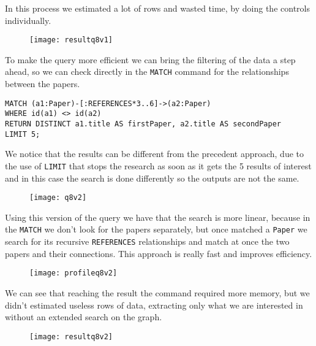 \begin{enumerate}
    In this process we estimated a lot of rows and wasted time, by doing the controls individually.
    \begin{figure}[H]
        \begin{center}
            \texttt{[image: resultq8v1]}
            \label{fig:resultq8v1}%
        \end{center}
    \end{figure}
    To make the query more efficient we can bring the filtering of the data a step ahead, so we can check directly in the \verb|MATCH| command for the relationships between the papers.
    \begin{lstlisting}[label={lst:lstlisting36}]
MATCH (a1:Paper)-[:REFERENCES*3..6]->(a2:Paper)
WHERE id(a1) <> id(a2)
RETURN DISTINCT a1.title AS firstPaper, a2.title AS secondPaper
LIMIT 5;
    \end{lstlisting}
    We notice that the results can be different from the precedent approach, due to the use of \verb|LIMIT| that stops the research as soon as it gets the 5 results of interest and in this case the search is done differently so the outputs are not the same.
    \begin{figure}[H]
        \begin{center}
            \texttt{[image: q8v2]}
            \label{fig:q8v2}%
        \end{center}
    \end{figure}
    Using this version of the query we have that the search is more linear, because in the \verb|MATCH| we don't look for the papers separately, but once matched a \verb|Paper| we search for its recursive \verb|REFERENCES| relationships and match at once the two papers and their connections.
    This approach is really fast and improves efficiency.
    \begin{figure}[H]
        \begin{center}
            \texttt{[image: profileq8v2]}
            \label{fig:profileq8v2}%
        \end{center}
    \end{figure}
    We can see that reaching the result the command required more memory, but we didn't estimated useless rows of data, extracting only what we are interested in without an extended search on the graph.
    \begin{figure}[H]
        \begin{center}
            \texttt{[image: resultq8v2]}
            \label{fig:resultq8v2}%

\end{center}
\end{figure}
\end{enumerate}
